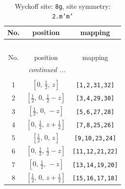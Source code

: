 \documentclass[fleqn,8pt]{jsarticle}
\begin{document}
\begin{longtable}{ccc}
\caption{Wyckoff site: {\tt 8g}, site symmetry: {\tt 2.m'm'}}
 \\
 \hline \hline
No. & position & mapping \\ \hline \endfirsthead

\multicolumn{2}{l}{\tablename\ \thetable{}} \\
 \hline \hline
No. & position & mapping \\ \hline \endhead

 \hline \hline
\multicolumn{2}{r}{\footnotesize\it continued ...} \\ \endfoot

 \hline \hline
\multicolumn{2}{r}{} \\ \endlastfoot

1 & $\left[ 0,\, \frac{1}{2},\, z \right]$ & {\tt [1,2,31,32]} \\ \hline
2 & $\left[ \frac{1}{2},\, 0,\, \frac{1}{2} - z \right]$ & {\tt [3,4,29,30]} \\ \hline
3 & $\left[ \frac{1}{2},\, 0,\, - z \right]$ & {\tt [5,6,27,28]} \\ \hline
4 & $\left[ 0,\, \frac{1}{2},\, z + \frac{1}{2} \right]$ & {\tt [7,8,25,26]} \\ \hline
5 & $\left[ \frac{1}{2},\, 0,\, z \right]$ & {\tt [9,10,23,24]} \\ \hline
6 & $\left[ 0,\, \frac{1}{2},\, \frac{1}{2} - z \right]$ & {\tt [11,12,21,22]} \\ \hline
7 & $\left[ 0,\, \frac{1}{2},\, - z \right]$ & {\tt [13,14,19,20]} \\ \hline
8 & $\left[ \frac{1}{2},\, 0,\, z + \frac{1}{2} \right]$ & {\tt [15,16,17,18]} \\
\end{longtable}
\renewcommand{\arraystretch}{1.2}
\end{document}
